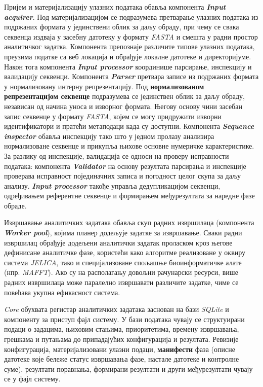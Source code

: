 \documentclass[12pt,oneside]{memoir}
\begin{document}
Пријем и материјализацију улазних података обавља компонента \textbf{\textit{Input acquirer}}. Под материјализацијом се подразумева претварање улазних података из подржаних формата у јединствени облик за даљу обраду, при чему се свака секвенца издваја у засебну датотеку у формату \textit{FASTA} и смешта у радни простор аналитичког задатка. Компонента препознаје различите типове улазних података, преузима податке са веб локација и обрађује локалне датотеке и директоријуме. Након тога компонента \textbf{\textit{Input processor}} координише парсирање, инспекцију и валидацију секвенци. Компонента \textbf{\textit{Parser}} претвара записе из подржаних формата у нормализовану интерну репрезентацију. Под \textbf{нормализованом репрезентацијом секвенце} подразумева се јединствен облик за даљу обраду, независан од начина уноса и изворног формата. Његову основу чини засебан запис секвенце у формату \textit{FASTA}, којем се могу придружити изворни идентификатори и пратећи метаподаци када су доступни. Компонента \textbf{\textit{Sequence inspector}} обавља инспекцију тако што у једном пролазу анализира нормализоване секвенце и прикупља њихове основне нумеричке карактеристике. За разлику од инспекције, валидација се односи на проверу исправности података: компонента \textbf{\textit{Validator}} на основу резултата парсирања и инспекције проверава исправност појединачних записа и погодност целог скупа за даљу анализу. \textbf{\textit{Input processor}} такође управља дедупликацијом секвенци, одређивањем референтне секвенце и формирањем међурезултата за наредне фазе обраде.

Извршавање аналитичких задатака обавља скуп радних извршилаца (компонента \textbf{\textit{Worker pool}}), којима планер додељује задатке за извршавање. Сваки радни извршилац обрађује додељени аналитички задатак проласком кроз његове дефинисане аналитичке фазе, користећи како алгоритме реализоване у оквиру система \textit{JELICA}, тако и специјализоване спољашње биоинформатичке алате (нпр. \textit{MAFFT}). Ако су на располагању довољни рачунарски ресурси, више радних извршилаца може паралелно извршавати различите задатке, чиме се повећава укупна ефикасност система.

\textit{Core} обухвата регистар аналитичких задатака заснован на бази \textit{SQLite} и компоненту за приступ фајл систему. У бази података чувају се структуирани подаци о задацима, њиховим стањима, приоритетима, времену извршавања, грешкама и путањама до припадајућих конфигурација и резултата. Ревизије конфигурација, материјализовани улазни подаци, \textbf{манифести} фаза (описне датотеке које бележе статус извршавања фазе, настале датотеке и контролне суме), резултати поравнања, формирани резултати и други међурезултати чувају се у фајл систему.
\end{document}
